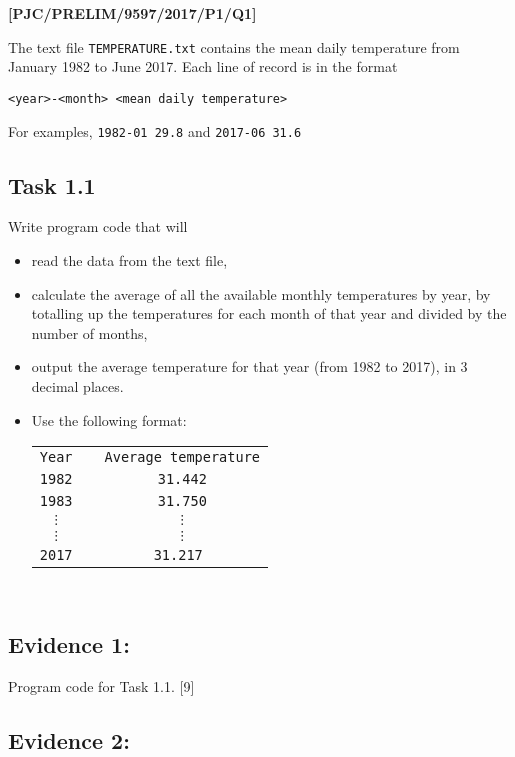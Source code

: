 \item \textbf{{[}PJC/PRELIM/9597/2017/P1/Q1{]} }

The text file \texttt{TEMPERATURE.txt} contains the mean daily temperature
from January 1982 to June 2017. Each line of record is in the format 
\noindent \begin{center}
\texttt{<year>-<month> <mean daily temperature> }
\par\end{center}

For examples, \texttt{1982-01 29.8} and \texttt{2017-06 31.6} 

\subsection*{Task 1.1 }

Write program code that will 
\begin{itemize}
\item read the data from the text file, 
\item calculate the average of all the available monthly temperatures by
year, by totalling up the temperatures for each month of that year
and divided by the number of months, 
\item output the average temperature for that year (from 1982 to 2017),
in 3 decimal places.
\item Use the following format: 
\noindent \begin{center}
\texttt{}%
\begin{tabular}{ccc}
\texttt{Year} &  & \texttt{Average temperature}\tabularnewline
\texttt{1982} &  & \texttt{31.442}\tabularnewline
\texttt{1983} &  & \texttt{31.750}\tabularnewline
\texttt{$\vdots$} &  & \texttt{$\vdots$}\tabularnewline
\texttt{$\vdots$} &  & \texttt{$\vdots$}\tabularnewline
\texttt{2017} &  & \texttt{31.217 }\tabularnewline
\end{tabular}\texttt{ }
\par\end{center}
\end{itemize}

\subsection*{Evidence 1: }

Program code for Task 1.1.\hfill{} {[}9{]}

\subsection*{Evidence 2: }


